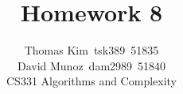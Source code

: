 \documentclass[12pt]{article}
\begin{document}
\title{Homework 8}
\author{Thomas Kim~tsk389~51835\\David Munoz~dam2989~51840\\
CS331 Algorithms and Complexity}

\renewcommand{\arraystretch}{2.0}

\date{} %


\maketitle

\onecolumn









\end{document}
